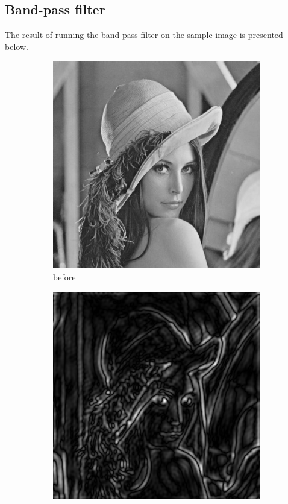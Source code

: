 \documentclass[12pt]{article}
\begin{document}
\subsection{Band-pass filter}
The result of running the band-pass filter on the sample image is presented below.
\begin{figure}[H]\centering
    \begin{subfigure}[t]{\subfiguresize}\centering
        \includegraphics[width=\textwidth]{img/lena.png}
        \caption{before}
    \end{subfigure}
    \hspace{2em}
    \begin{subfigure}[t]{\subfiguresize}\centering
        \includegraphics[width=\textwidth]{img/lena_bandpass.png}

\end{subfigure}
\end{figure}
\end{document}
